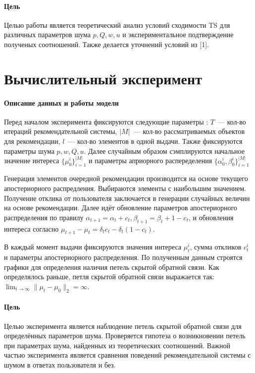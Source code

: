 \documentclass[12pt, twoside]{article}
\begin{document}
\paragraph{Цель}
Целью работы является теоретический анализ условий сходимости TS для различных параметров шума $p, Q, w, u$ и экспериментальное подтверждение полученых соотношений. 
Также делается уточнений условий из [1]. 

\section{Вычислительный эксперимент}
\paragraph{Описание данных и работы модели}
Перед началом эксперимента фиксируются следующие параметры : $T$~--- кол-во итераций рекомендательной системы, $|M|$~--- кол-во рассматриваемых объектов для рекомендации, $l$~--- кол-во элементов в одной выдачи. 
Также фиксируются параметры шума $p, w, Q, u$.
Далее случайным образом сэмплируются начальное значение интереса $\{\mu_0^i\}_{i=1}^{|M|}$ и параметры априорного распеределения $\{\alpha_0^i, \beta_0^i\}_{i=1}^{|M|}$  

Генерация элементов очередной рекомендации производится на основе текущего апостериорного распредления. 
Выбираются элементы с наибольшим значением. 
Получение отклика от пользователя заключается в генерации случайных величин на основе рекомендации.
Далее идёт обновление параметров апостериорного распределения по правилу $\alpha_{t+1} = \alpha_t + c_t, \beta_{t+1} = \beta_t + 1 - c_t$, и обновления интереса согласно 
$\mu_{t+1} - \mu_{t} = \delta_t c_t - \delta_t (1 - c_t)$.

В каждый момент выдачи фиксируются значения интереса $\mu_t^i$, сумма откликов $c_t^i$ и параметры апостериорного распределения. 
По полученным данным строятся графики для определения наличия петель скрытой обратной связи.
Как определялось раньше, петля скрытой обратной связи выражается так: $\lim_{t \to \infty} \|\mu_t - \mu_0 \|_2 = \infty$.

\paragraph{Цель}
Целью эксперимента является наблюдение петель скрытой обратной связи для определённых параметров шума. 
Проверяется гипотеза о возникновении петель при параметрах шума, найденных из теоретических соотношений. 
Важной частью эксперимента является сравнения поведений рекомендательной системы с шумом в ответах пользователя и без. 
\end{document}
